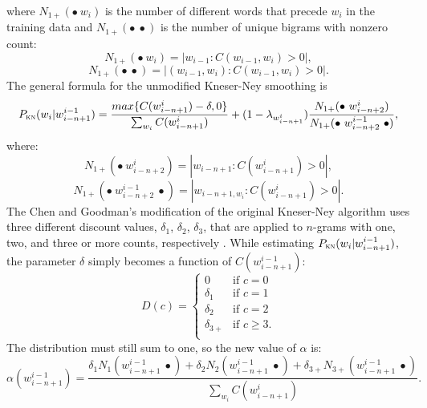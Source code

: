 	where $N_{1+}(\bullet~w_{i})$ is the number of different words that precede $w_{i}$ in the training data and $N_{1+}(\bullet~\bullet)$ is the number of unique bigrams with nonzero count:
	\begin{equation}
		N_{1+}(\bullet~w_{i})=|{w_{i-1}:C(w_{i-1}, w_{i})>0}|,
	\end{equation}
	\begin{equation}
		N_{1+}(\bullet~\bullet)=|{(w_{i-1}, w_{i}):C(w_{i-1}, w_{i})>0}|.
	\end{equation}
	The general formula for the unmodified Kneser-Ney smoothing is
	\begin{equation}
		P_{\textsc{kn}}(w_{i}|w_{i-n+1}^{i-1})= \frac{max\{C(w_{i-n+1}^{i})-\delta, 0\}}{\sum_{w_{i}}C(w_{i-n+1}^{i})}+(1-\lambda_{w_{i-n+1}^{i}})\frac{N_{1+}(\bullet~w_{i-n+2}^{i})}{N_{1+}(\bullet~w_{i-n+2}^{i-1}~\bullet)},
	\end{equation}
	where:
	\begin{equation}
		N_{1+}(\bullet~w_{i-n+2}^{i})=|{w_{i-n+1}:C(w_{i-n+1}^{i})>0}|,
	\end{equation}
	\begin{equation}
		N_{1+}(\bullet~w_{i-n+2}^{i-1}~\bullet)=|{w_{i-n+1, w_{i}}:C(w_{i-n+1}^{i})>0}|.
	\end{equation}
	The Chen and Goodman's modification of the original Kneser-Ney algorithm uses three different discount values, $\delta_{1}$, $\delta_{2}$, $\delta_{3}$, that are applied to \mbox{$n$-grams} with one, two, and three or more counts, respectively \cite{chen1996empirical}. While estimating $P_{\textsc{kn}}(w_{i}|w_{i-n+1}^{i-1})$, the parameter $\delta$ simply becomes a function of $C(w_{i-n+1}^{i-1})$: 
	\begin{equation}
		D(c)=	
		\begin{cases}
			0 & \text{if } c=0\\
			\delta_{1} & \text{if } c=1\\
			\delta_{2} & \text{if } c=2\\
			\delta_{3+} & \text{if } c\geq3.\\
		\end{cases}
	\end{equation}
	The distribution must still sum to one, so the new value of $\alpha$ is:
	\begin{equation}
		\alpha(w_{i-n+1}^{i-1})=\frac{\delta_{1}N_{1}(w_{i-n+1}^{i-1}~\bullet)+\delta_{2}N_{2}(w_{i-n+1}^{i-1}~\bullet)+\delta_{3+}N_{3+}(w_{i-n+1}^{i-1}~\bullet)}{\sum_{w_{i}}C(w_{i-n+1}^{i})}.
	\end{equation}

